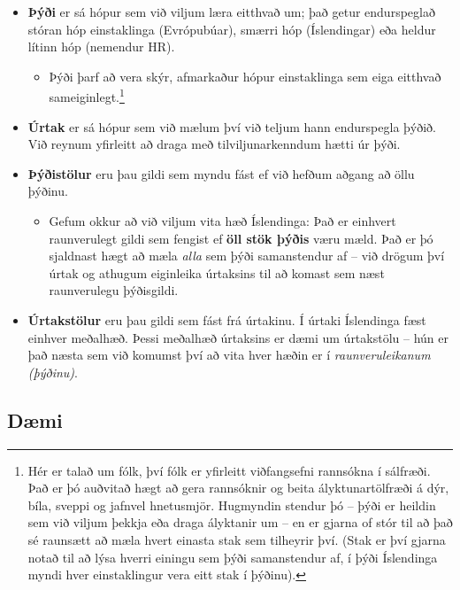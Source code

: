 \documentclass[
]{book}
\providecommand{\tightlist}{%
  \setlength{\itemsep}{0pt}\setlength{\parskip}{0pt}}
\begin{document}
\begin{itemize}
\tightlist
\item
  \textbf{Þýði} er sá hópur sem við viljum læra eitthvað um; það getur
  endurspeglað stóran hóp einstaklinga (Evrópubúar), smærri hóp
  (Íslendingar) eða heldur lítinn hóp (nemendur HR).

  \begin{itemize}
  \tightlist
  \item
    Þýði þarf að vera skýr, afmarkaður hópur einstaklinga sem eiga
    eitthvað sameiginlegt.\footnote{Hér er talað um fólk, því fólk er yfirleitt viðfangsefni
      rannsókna í sálfræði. Það er þó auðvitað hægt að gera rannsóknir og
      beita ályktunartölfræði á dýr, bíla, sveppi og jafnvel hnetusmjör.
      Hugmyndin stendur þó -- þýði er heildin sem við viljum þekkja eða
      draga ályktanir um -- en er gjarna of stór til að það sé raunsætt að
      mæla hvert einasta stak sem tilheyrir því. (Stak er því gjarna notað
      til að lýsa hverri einingu sem þýði samanstendur af, í þýði
      Íslendinga myndi hver einstaklingur vera eitt stak í þýðinu).}
  \end{itemize}
\item
  \textbf{Úrtak} er sá hópur sem við mælum því við teljum hann endurspegla
  þýðið. Við reynum yfirleitt að draga með tilviljunarkenndum hætti úr þýði.
\item
  \textbf{Þýðistölur} eru þau gildi sem myndu fást ef við hefðum aðgang að
  öllu þýðinu.

  \begin{itemize}
  \tightlist
  \item
    Gefum okkur að við viljum vita hæð Íslendinga: Það er einhvert raunverulegt gildi sem fengist ef \textbf{öll stök þýðis} væru mæld. Það er þó sjaldnast hægt að mæla \emph{alla} sem þýði samanstendur af -- við drögum því úrtak og athugum eiginleika úrtaksins til að komast sem næst raunverulegu þýðisgildi.
  \end{itemize}
\item
  \textbf{Úrtakstölur} eru þau gildi sem fást frá úrtakinu. Í úrtaki Íslendinga fæst einhver meðalhæð. Þessi meðalhæð úrtaksins er dæmi um úrtakstölu -- hún er það næsta sem við komumst því að vita hver hæðin er í \emph{raunveruleikanum (þýðinu)}.
\end{itemize}

\hypertarget{duxe6mi}{%
\subsection*{Dæmi}\label{duxe6mi}}
\end{document}
